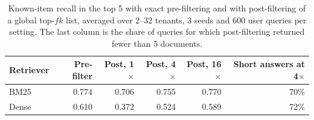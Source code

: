 \begin{table}[t]
\centering
\caption{Known-item recall in the top 5 with exact pre-filtering and with post-filtering of a global top-$fk$ list, averaged over 2--32 tenants, 3 seeds and 600 user queries per setting. The last column is the share of queries for which post-filtering returned fewer than 5 documents.}
\label{tab:postfilter}
\small
\setlength{\tabcolsep}{4pt}
\begin{tabular}{lrrrrr}
\toprule
Retriever & Pre-filter & Post, 1$\times$ & Post, 4$\times$ & Post, 16$\times$ & Short answers at 4$\times$ \\
\midrule
BM25 & 0.774 & 0.706 & 0.755 & 0.770 & 70\% \\
Dense & 0.610 & 0.372 & 0.524 & 0.589 & 72\% \\
\bottomrule
\end{tabular}
\end{table}
